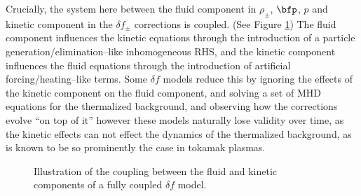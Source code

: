     Crucially, the system here between the fluid component in $\rho_{\pm}$, $\bfp$, $p$ and kinetic component in the $\delta\! f_{\pm}$ corrections is coupled. (See Figure \ref{fig:delta f coupling}) The fluid component influences the kinetic equations through the introduction of a particle generation/elimination--like inhomogeneous RHS, and the kinetic component influences the fluid equations through the introduction of artificial forcing/heating--like terms. Some $\delta\! f$ models reduce this by ignoring the effects of the kinetic component on the fluid component, and solving a set of MHD equations for the thermalized background, and observing how the corrections evolve ``on top of it''  however these models naturally lose validity over time, as the kinetic effects can not effect the dynamics of the thermalized background, as is known to be so prominently the case in tokamak plasmas.

    \begin{figure}[!ht]
        \centering
        \caption{Illustration of the coupling between the fluid and kinetic components of a fully coupled $\delta\! f$ model.}
        \label{fig:delta f coupling}
    \end{figure}


    